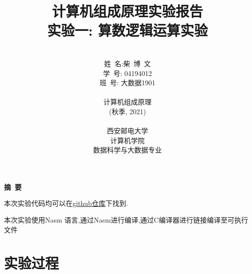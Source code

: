 \documentclass[UTF8]{ctexart}
\begin{document}
\renewcommand{\contentsname}{目\ 录}
\renewcommand{\appendixname}{附录}
\renewcommand{\appendixpagename}{附录}
\renewcommand{\refname}{参考文献} 
\renewcommand{\figurename}{图}
\renewcommand{\tablename}{表}
\renewcommand{\today}{\year\month\day}

\title{{\Huge 计算机组成原理实验报告{\large\linebreak\\}}{\Large 实验一: 算数逻辑运算实验\linebreak\linebreak}}
\author{\\姓\ 名:柴\ 博\ 文\\
学\ 号: 04194012\\
班\ 号: 大数据1901\\\\
计算机组成原理\\
(秋季, 2021)\\\\
西安邮电大学\\
计算机学院\\
数据科学与大数据专业}
\date{\today}
\newpage

\begin{center}
{\Large\bf{摘\ 要\\}}
\end{center}

本次实验代码均可以在\href{https://github.com/lovebaihezi/lab/tree/main/Asm/riscv}{github仓库}下找到.

本次实验使用Nasm 语言,通过Nasm进行编译,通过C编译器进行链接编译至可执行文件

\newpage
\begin{center}
\tableofcontents\label{c}
\end{center}

\newpage

\section{实验过程}\label{overview}
\end{document}
